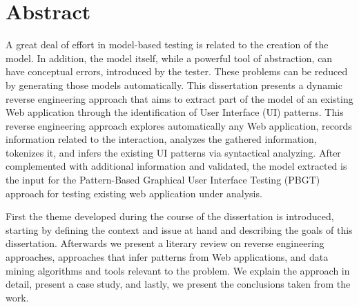 \chapter*{Abstract}
A great deal of effort in model-based testing is related to the creation of the model. In addition, the model itself, while a powerful tool of abstraction, can have conceptual errors, introduced by the tester. These problems can be reduced by generating those models automatically. This dissertation presents a dynamic reverse engineering approach that aims to extract part of the model of an existing Web application through the identification of User Interface (UI) patterns. This reverse engineering approach explores automatically any Web application, records information related to the interaction, analyzes the gathered information, tokenizes it, and infers the existing UI patterns via syntactical analyzing. After complemented with additional information and validated, the model extracted is the input for the Pattern-Based Graphical User Interface Testing (PBGT) approach for testing existing web application under analysis.

First the theme developed during the course of the dissertation is introduced, starting by defining the context and issue at hand and describing the goals of this dissertation. Afterwards we present a literary review on reverse engineering approaches, approaches that infer patterns from Web applications, and data mining algorithms and tools relevant to the problem. We explain the approach in detail, present a case study, and lastly, we present the conclusions taken from the work.

